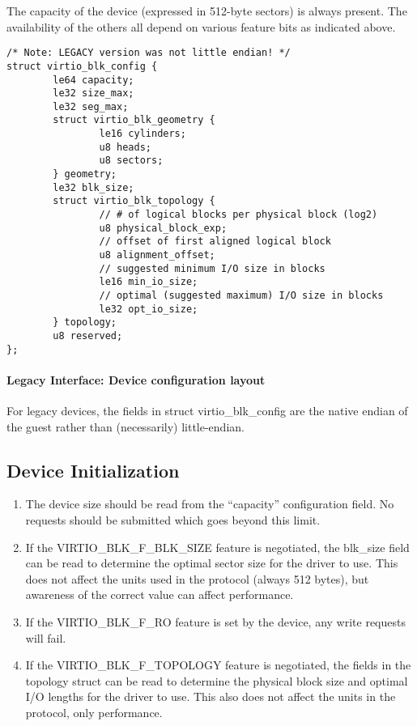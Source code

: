 The capacity of the device (expressed in 512-byte sectors) is always
present. The availability of the others all depend on various feature
bits as indicated above.

\begin{lstlisting}
/* Note: LEGACY version was not little endian! */
struct virtio_blk_config {
        le64 capacity;
        le32 size_max;
        le32 seg_max;
        struct virtio_blk_geometry {
                le16 cylinders;
                u8 heads;
                u8 sectors;
        } geometry;
        le32 blk_size;
        struct virtio_blk_topology {
                // # of logical blocks per physical block (log2)
                u8 physical_block_exp;
                // offset of first aligned logical block
                u8 alignment_offset;
                // suggested minimum I/O size in blocks
                le16 min_io_size;
                // optimal (suggested maximum) I/O size in blocks
                le32 opt_io_size;
        } topology;
        u8 reserved;
};
\end{lstlisting}


\paragraph{Legacy Interface: Device configuration layout}\label{sec:Device Types / Block Device / Feature bits / Device configuration layout / Legacy Interface: Device configuration layout}
For legacy devices, the fields in struct virtio_blk_config are the
native endian of the guest rather than (necessarily) little-endian.


\subsection{Device Initialization}\label{sec:Device Types / Block Device / Device Initialization}

\begin{enumerate}
\item The device size should be read from the “capacity”
  configuration field. No requests should be submitted which goes
  beyond this limit.

\item If the VIRTIO_BLK_F_BLK_SIZE feature is negotiated, the
  blk_size field can be read to determine the optimal sector size
  for the driver to use. This does not affect the units used in
  the protocol (always 512 bytes), but awareness of the correct
  value can affect performance.

\item If the VIRTIO_BLK_F_RO feature is set by the device, any write
  requests will fail.

\item If the VIRTIO_BLK_F_TOPOLOGY feature is negotiated, the fields in the
  topology struct can be read to determine the physical block size and optimal
  I/O lengths for the driver to use. This also does not affect the units
  in the protocol, only performance.
\end{enumerate}

